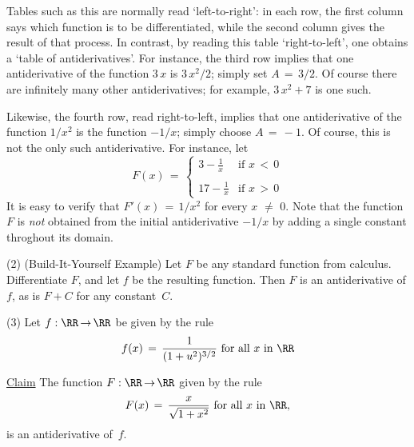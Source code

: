 {        Tables such as this are normally read `left-to-right': in each row, the first column says which function is to be differentiated,
    while the second column gives the result of that process. In contrast, by reading this table `right-to-left',
    one obtains a `table of antiderivatives'. For instance, the third row implies that one antiderivative of the function $3\,x$ is $3\,x^{2}/2$;
    simply set $A \,=\, 3/2$. Of course there are infinitely many other antiderivatives; for example, $3\,x^{2} + 7$ is one such.

        Likewise, the fourth row, read right-to-left,
    implies that one antiderivative of the function $1/x^{2}$ is the function $-1/x$; simply choose $A \,=\, -1$.
    Of course, this is not the only such antiderivative. For instance, let
        \begin{displaymath}
        F(x) \,=\, \left\{
        \begin{array}{cl}
        {\displaystyle 3-\frac{1}{x}}  & \mbox{if $x\,<\,0$} \\
                                       &                     \\
        {\displaystyle 17-\frac{1}{x}} & \mbox{if $x\,>\,0$}
        \end{array}
                                \right.
        \end{displaymath}
    It is easy to verify that $F'(x) \,=\, 1/x^{2}$ for every $x \,\,{\neq}\,\, 0$.
    Note that the function $F$ is {\em not} obtained from the initial antiderivative $-1/x$ by adding a single constant throghout its domain.


\V

        (2) (Build-It-Yourself Example) Let $F$ be any standard function from calculus. Differentiate $F$, and let $f$ be the resulting function.
    Then $F$ is an antiderivative of $f$, as is $F+C$ for any constant~$C$.

\V

        (3) Let $f:{\RR} \,{\rightarrow}\, {\RR}$ be given by the rule
        \begin{displaymath}
        f(x) \,=\, \frac{1}{(1+u^{2})^{3/2}} \mbox{ for all $x$ in ${\RR}$}
        \end{displaymath}


        \underline{Claim} The function $F:{\RR} \,{\rightarrow}\, {\RR}$ given by the rule
        \begin{displaymath}
        F(x) \,=\, \frac{x}{\sqrt{1+x^{2}}} \mbox{ for all $x$ in~${\RR}$},
        \end{displaymath}
    is an antiderivative of~$f$.

}
